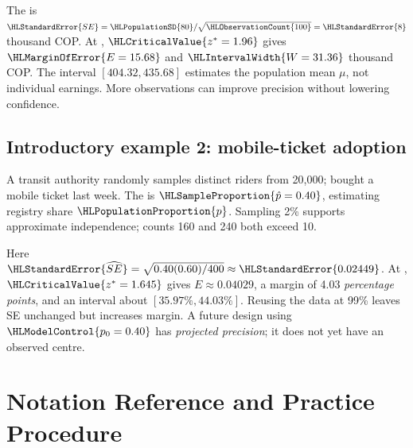 The  is $\HLStandardError{SE}=\HLPopulationSD{80}/\sqrt{\HLObservationCount{100}}=\HLStandardError{8}$ thousand COP. At , $\HLCriticalValue{z^*=1.96}$ gives $\HLMarginOfError{E=15.68}$ and $\HLIntervalWidth{W=31.36}$ thousand COP. The interval $[404.32,435.68]$ estimates the population mean $\mu$, not individual earnings. More observations can improve precision without lowering confidence.
\subsection{Introductory example 2: mobile-ticket adoption}\label{ex:intro-two}
A transit authority randomly samples  distinct riders from 20,000;  bought a mobile ticket last week. The  is $\HLSampleProportion{\hat p=0.40}$, estimating registry share $\HLPopulationProportion{p}$. Sampling 2\% supports approximate independence; counts 160 and 240 both exceed 10.

Here $\HLStandardError{\widehat{SE}}=\sqrt{0.40(0.60)/400}\approx\HLStandardError{0.02449}$. At , $\HLCriticalValue{z^*=1.645}$ gives $E\approx0.04029$, a margin of 4.03 \emph{percentage points}, and an interval about $[35.97\%,44.03\%]$. Reusing the data at 99\% leaves SE unchanged but increases margin. A future design using $\HLModelControl{p_0=0.40}$ has \emph{projected precision}; it does not yet have an observed centre.
\clearpage
\section{Notation Reference and Practice Procedure}\label{sec:notation-and-procedure}

